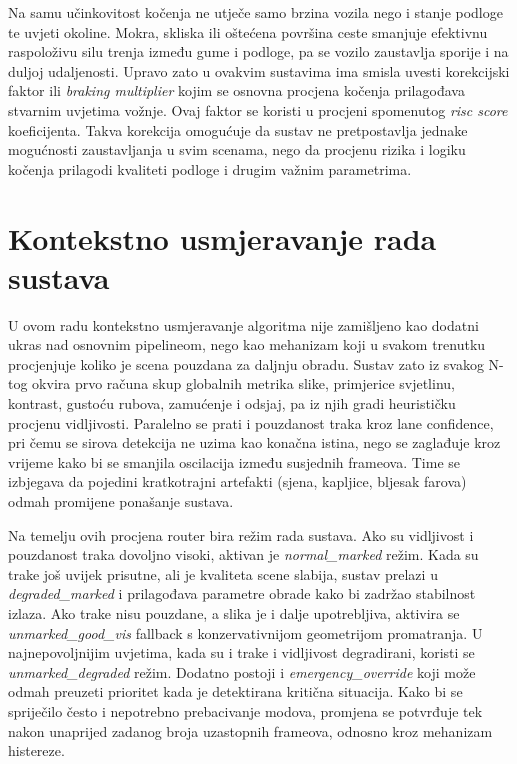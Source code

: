 Na samu učinkovitost kočenja ne utječe samo brzina vozila nego i stanje podloge te uvjeti okoline. Mokra, skliska ili oštećena površina ceste smanjuje efektivnu raspoloživu silu trenja između gume i podloge, pa se vozilo zaustavlja sporije i na duljoj udaljenosti. Upravo zato u ovakvim sustavima ima smisla uvesti korekcijski faktor ili \textit{braking multiplier} kojim se osnovna procjena kočenja prilagođava stvarnim uvjetima vožnje. Ovaj faktor se koristi u procjeni spomenutog \textit{risc score} koeficijenta. Takva korekcija omogućuje da sustav ne pretpostavlja jednake mogućnosti zaustavljanja u svim scenama, nego da procjenu rizika i logiku kočenja prilagodi kvaliteti podloge i drugim važnim parametrima.

\section{Kontekstno usmjeravanje rada sustava}
U ovom radu kontekstno usmjeravanje algoritma nije zamišljeno kao dodatni ukras nad osnovnim pipelineom, nego kao mehanizam koji u svakom trenutku procjenjuje koliko je scena pouzdana za daljnju obradu. Sustav zato iz svakog N-tog okvira prvo računa skup globalnih metrika slike, primjerice svjetlinu, kontrast, gustoću rubova, zamućenje i odsjaj, pa iz njih gradi heurističku procjenu vidljivosti. Paralelno se prati i pouzdanost traka kroz lane confidence, pri čemu se sirova detekcija ne uzima kao konačna istina, nego se zaglađuje kroz vrijeme kako bi se smanjila oscilacija između susjednih frameova. Time se izbjegava da pojedini kratkotrajni artefakti (sjena, kapljice, bljesak farova) odmah promijene ponašanje sustava.

Na temelju ovih procjena router bira režim rada sustava. Ako su vidljivost i pouzdanost traka dovoljno visoki, aktivan je \textit{normal\_marked} režim. Kada su trake još uvijek prisutne, ali je kvaliteta scene slabija, sustav prelazi u \textit{degraded\_marked} i prilagođava parametre obrade kako bi zadržao stabilnost izlaza. Ako trake nisu pouzdane, a slika je i dalje upotrebljiva, aktivira se \textit{unmarked\_good\_vis} fallback s konzervativnijom geometrijom promatranja. U najnepovoljnijim uvjetima, kada su i trake i vidljivost degradirani, koristi se \textit{unmarked\_degraded} režim. Dodatno postoji i \textit{emergency\_override} koji može odmah preuzeti prioritet kada je detektirana kritična situacija. Kako bi se spriječilo često i nepotrebno prebacivanje modova, promjena se potvrđuje tek nakon unaprijed zadanog broja uzastopnih frameova, odnosno kroz mehanizam histereze.


